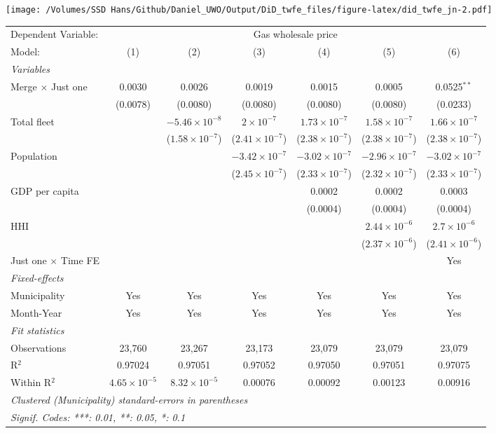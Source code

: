 \documentclass[
]{article}
\begin{document}
\texttt{[image: /Volumes/SSD Hans/Github/Daniel\_UWO/Output/DiD\_twfe\_files/figure-latex/did\_twfe\_jn-2.pdf]}

\begin{tabular}{lcccccc}
\tabularnewline\midrule\midrule
Dependent Variable:&\multicolumn{6}{c}{Gas wholesale price}\\
Model:&(1) & (2) & (3) & (4) & (5) & (6)\\
\midrule \emph{Variables}&   &   &   &   &   &  \\
Merge $\times $ Just one & 0.0030 & 0.0026 & 0.0019 & 0.0015 & 0.0005 & 0.0525$^{**}$\\
  &(0.0078) & (0.0080) & (0.0080) & (0.0080) & (0.0080) & (0.0233)\\
Total fleet &    & $-5.46\times 10^{-8}$ & $2\times 10^{-7}$ & $1.73\times 10^{-7}$ & $1.58\times 10^{-7}$ & $1.66\times 10^{-7}$\\
  &   & ($1.58\times 10^{-7}$) & ($2.41\times 10^{-7}$) & ($2.38\times 10^{-7}$) & ($2.38\times 10^{-7}$) & ($2.38\times 10^{-7}$)\\
Population &    &    & $-3.42\times 10^{-7}$ & $-3.02\times 10^{-7}$ & $-2.96\times 10^{-7}$ & $-3.02\times 10^{-7}$\\
  &   &    & ($2.45\times 10^{-7}$) & ($2.33\times 10^{-7}$) & ($2.32\times 10^{-7}$) & ($2.33\times 10^{-7}$)\\
GDP per capita &    &    &    & 0.0002 & 0.0002 & 0.0003\\
  &   &    &    & (0.0004) & (0.0004) & (0.0004)\\
HHI &    &    &    &    & $2.44\times 10^{-6}$ & $2.7\times 10^{-6}$\\
  &   &    &    &    & ($2.37\times 10^{-6}$) & ($2.41\times 10^{-6}$)\\
Just one $\times$ Time FE &  &  &  &  &  & Yes\\
\midrule \emph{Fixed-effects}&   &   &   &   &   &  \\
Municipality & Yes & Yes & Yes & Yes & Yes & Yes\\
Month-Year & Yes & Yes & Yes & Yes & Yes & Yes\\
\midrule \emph{Fit statistics}&  & & & & & \\
Observations & 23,760&23,267&23,173&23,079&23,079&23,079\\
R$^2$ & 0.97024&0.97051&0.97052&0.97050&0.97051&0.97075\\
Within R$^2$ & $4.65\times 10^{-5}$&$8.32\times 10^{-5}$&0.00076&0.00092&0.00123&0.00916\\
\midrule\midrule\multicolumn{7}{l}{\emph{Clustered (Municipality) standard-errors in parentheses}}\\
\multicolumn{7}{l}{\emph{Signif. Codes: ***: 0.01, **: 0.05, *: 0.1}}\\
\end{tabular}
\end{document}
